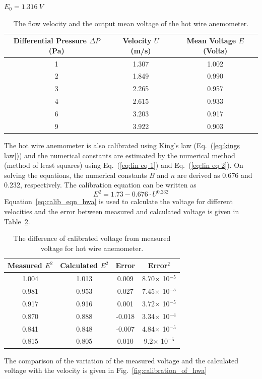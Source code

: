 \begin{table}[ht]
$E_0 = 1.316~V$
\centering
    \caption{The flow velocity and the output mean voltage of the hot wire anemometer.}
    \begin{tabular}{|c|c|c|}
    \toprule
       \textbf{Differential Pressure $\Delta P$ (Pa)}  & \textbf{Velocity $U$ (m/s)} & \textbf{Mean Voltage $E$ (Volts)} \\
       \midrule
        1 & 1.307 & 1.002 \\ \hline
        2 & 1.849 & 0.990 \\ \hline
        3 & 2.265 & 0.957 \\ \hline
        4 & 2.615 & 0.933 \\ \hline
        6 & 3.203 & 0.917 \\ \hline
        9 & 3.922 & 0.903 \\ 
        \bottomrule
    \end{tabular}
    \label{tab:output_hwa}
\end{table}

The hot wire anemometer is also calibrated using King's law (Eq.~(\ref{eq:kings law})) and the numerical constants are estimated by the numerical method (method of least squares) using Eq.~(\ref{eq:lin eq 1}) and Eq.~(\ref{eq:lin eq 2}). On solving the equations, the numerical constants $B$ and $n$ are derived as 0.676 and 0.232, respectively. The calibration equation can be written as 
\begin{equation}\label{eq:calib_eqn_hwa}
    E^2 = 1.73 - 0.676\cdot U^{0.232}
\end{equation}
Equation~\ref{eq:calib_eqn_hwa} is used to calculate the voltage for different velocities and the error between measured and calculated voltage is given in Table~\ref{tab:error_hwa}.
\begin{table}[H]
    \centering
    \caption{The difference of calibrated voltage from measured voltage for hot wire anemometer.}
    \begin{tabular}{|c|c|c|c|}
    \toprule
         Measured $E^2$& Calculated $E^2$ & Error & Error$^2$\\
         \midrule
          1.004 & 1.013 & 0.009 & 8.70$\times$ 10$^{-5}$ \\ \hline
          0.981 & 0.953 & 0.027 & 7.45$\times$ 10$^{-5}$ \\ \hline
          0.917 & 0.916 & 0.001 & 3.72$\times$ 10$^{-5}$ \\ \hline
          0.870 & 0.888 & -0.018 & 3.34$\times$ 10$^{-4}$ \\ \hline
          0.841 & 0.848 & -0.007 & 4.84$\times$ 10$^{-5}$ \\ \hline
          0.815 & 0.805 & 0.010 & 9.2$\times$ 10$^{-5}$  \\
         \bottomrule
         
    \end{tabular}
    \label{tab:error_hwa}
\end{table}
The comparison of the variation of the measured voltage and the calculated voltage with the velocity is given in Fig.~\ref{fig:calibration_of_hwa}

